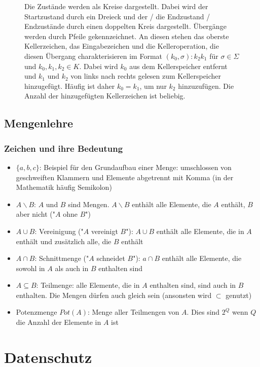 \documentclass{article}
\begin{document}
	\begin{figure}[!h]
		\centering
		
		\caption{Die Zustände werden als Kreise dargestellt. Dabei wird der Startzustand durch ein Dreieck und der / die Endzustand / Endzustände durch einen doppelten Kreis dargestellt. Übergänge werden durch Pfeile gekennzeichnet. An diesen stehen das oberste Kellerzeichen, das Eingabezeichen und die Kelleroperation, die diesen Übergang charakterisieren im Format $(k_0, \sigma): k_2 k_1$ für $\sigma \in \Sigma$ und $k_0, k_1, k_2 \in K$. Dabei wird $k_0$ aus dem Kellerspeicher entfernt und $k_1$ und $k_2$ von links nach rechts gelesen zum Kellerspeicher hinzugefügt. Häufig ist daher $k_0 = k_1$, um nur $k_2$ hinzuzufügen. Die Anzahl der hinzugefügten Kellerzeichen ist beliebig.}
	\end{figure}	
	
	\subsection{Mengenlehre}
	
	\subsubsection{Zeichen und ihre Bedeutung}
	
	\begin{itemize}
		\item $\{a, b, c\}$: Beispiel für den Grundaufbau einer Menge: umschlossen von geschweiften Klammern und Elemente abgetrennt mit Komma (in der Mathematik häufig Semikolon)
		\item $A \backslash B$: $A$ und $B$ sind Mengen. $A \backslash B$ enthält alle Elemente, die $A$ enthält, $B$ aber nicht ("$A$ ohne $B$")
		\item $A \cup B$: Vereinigung ("$A$ vereinigt $B$"): $A \cup B$ enthält alle Elemente, die in $A$ enthält und zusätzlich alle, die $B$ enthält
		\item $A \cap B$: Schnittmenge ("$A$ schneidet $B$"): $a \cap B$ enthält alle Elemente, die sowohl in $A$ als auch in $B$ enthalten sind
		\item $A \subseteq B$: Teilmenge: alle Elemente, die in $A$ enthalten sind, sind auch in $B$ enthalten. Die Mengen dürfen auch gleich sein (ansonsten wird $\subset$ genutzt)
		\item Potenzmenge $Pot(A)$: Menge aller Teilmengen von $A$. Dies sind $2^Q$ wenn $Q$ die Anzahl der Elemente in $A$ ist
	\end{itemize}

	\section{Datenschutz}
\end{document}
